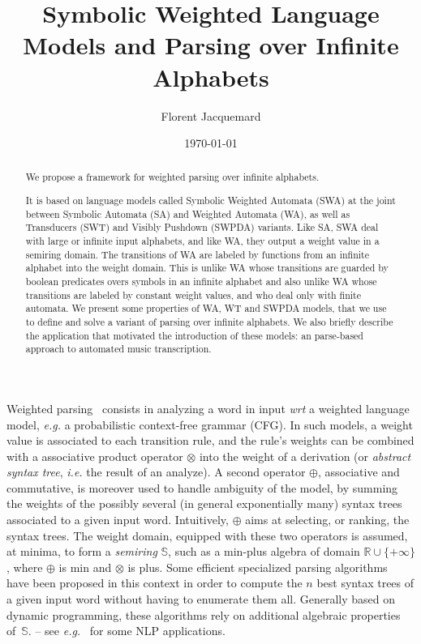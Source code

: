 \documentclass[runningheads]{llncs}
\title{Symbolic Weighted Language Models and Parsing over Infinite Alphabets}
\author{Florent Jacquemard}
\institute{INRIA \& CNAM, Paris, France\\
\email{florent.jacquemard@inria.fr}}
\date{\today}
\def\ie{\textit{i.e.}\xspace}
\def\eg{\textit{e.g.}\xspace}
\def\wrt{\textit{wrt}\xspace}
\newcommand{\Semiring}{\mathbb{S}}
\begin{document}
\thispagestyle{empty}
\maketitle

\begin{abstract}
We propose a framework for weighted parsing over infinite alphabets.

It is based on language models called Symbolic Weighted Automata (SWA) 
at the joint %
between Symbolic Automata (SA) and Weighted Automata (WA), 
as well as Transducers (SWT) and Visibly Pushdown (SWPDA) variants.
%
Like SA, SWA deal with large or infinite input alphabets, 
and like WA, they output a weight value in a semiring domain.
The transitions of WA are labeled by functions from an infinite alphabet into the weight domain. 
This is unlike WA whose transitions are guarded by boolean predicates 
overs symbols in an infinite alphabet 
and also unlike WA whose transitions are labeled by constant weight values, 
and who deal only with finite automata.
%
We present some properties of WA, WT and SWPDA models, 
that we use to define and solve a variant of parsing 
over infinite alphabets.
%
We also briefly describe the application that motivated the introduction of these models: 
an parse-based approach to automated music transcription.
\end{abstract}




Weighted parsing~\cite{Goodman99SemiringParsing,Nederhof03weightedParsing,MorbitzVogler19weighted-parsing} 
consists in analyzing a word in input \wrt a weighted language model, \eg a probabilistic context-free grammar (CFG).
In such models, a weight value is associated to each transition rule, %
and the rule's weights can be combined with a associative product operator $\otimes$ into 
the weight of a derivation (or \emph{abstract syntax tree}, \ie the result of an analyze).
A second operator $\oplus$, associative and commutative, 
is moreover used to handle ambiguity of the model, 
by summing the weights of the possibly several (in general exponentially many) 
syntax trees associated to a given input word.
Intuitively, $\oplus$ aims at selecting, or ranking, the syntax trees.
The weight domain, equipped with these two operators is assumed, at minima, 
to form a \emph{semiring} $\Semiring$, %
such as a min-plus algebra of domain $\mathbb{R} \cup \{ +\infty\}$, 
where $\oplus$ is min and $\otimes$ is plus.
Some efficient specialized parsing algorithms~\cite{Huang05kbest} have been proposed in this context 
in order to compute the $n$ best syntax trees of a given input word without having to enumerate them all.
Generally based on dynamic programming, these algorithms rely on 
additional algebraic properties of~$\Semiring$.
-- see \eg~\cite{Huang05kbest} for some NLP applications.
\end{document}
